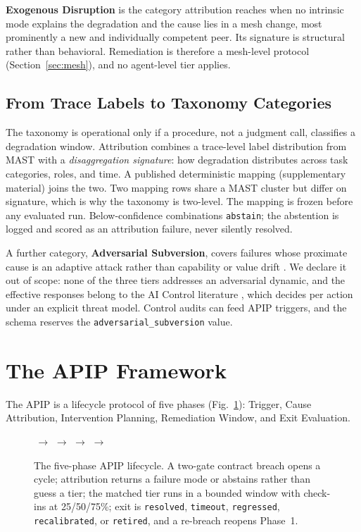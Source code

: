 \documentclass[conference]{IEEEtran}
\newcommand{\code}[1]{\texttt{\small #1}}
\begin{document}
\textbf{Exogenous Disruption} is the category attribution reaches when no
intrinsic mode explains the degradation and the cause lies in a mesh change,
most prominently a new and individually competent peer. Its signature is
structural rather than behavioral. Remediation is therefore a mesh-level
protocol (Section~\ref{sec:mesh}), and no agent-level tier applies.

\subsection{From Trace Labels to Taxonomy Categories}
\label{sec:mapping}

The taxonomy is operational only if a procedure, not a judgment call,
classifies a degradation window. Attribution combines a trace-level label
distribution from MAST \cite{cemri2025} with a \emph{disaggregation signature}:
how degradation distributes across task categories, roles, and time. A
published deterministic mapping (supplementary material) joins the two. Two
mapping rows share a MAST cluster but differ on signature, which is why the
taxonomy is two-level. The mapping is frozen before any evaluated run.
Below-confidence combinations \code{abstain}; the abstention is logged and
scored as an attribution failure, never silently resolved.

A further category, \textbf{Adversarial Subversion}, covers failures whose
proximate cause is an adaptive attack rather than capability or value drift
\cite{bhatt2025, terekhov2025}. We declare it out of scope: none of the three
tiers addresses an adversarial dynamic, and the effective responses belong to
the AI Control literature \cite{greenblatt2023}, which decides per action under
an explicit threat model. Control audits
can feed APIP triggers, and the schema reserves the
\code{adversarial\_subversion} value.

\section{The APIP Framework}
\label{sec:framework}

The APIP is a lifecycle protocol of five phases (Fig.~\ref{fig:lifecycle}):
Trigger, Cause Attribution, Intervention Planning, Remediation Window, and
Exit Evaluation.

\begin{figure}[t]
  \centering
  \scriptsize
  \setlength{\fboxsep}{2pt}
  \,$\rightarrow$\,\,$\rightarrow$\,\,$\rightarrow$\,\,$\rightarrow$\,
  \caption{The five-phase APIP lifecycle. A two-gate contract breach opens a
  cycle; attribution returns a failure mode or abstains rather than guess a
  tier; the matched tier runs in a bounded window with check-ins at 25/50/75\%;
  exit is \code{resolved}, \code{timeout}, \code{regressed},
  \code{recalibrated}, or \code{retired}, and a re-breach reopens Phase~1.}
  \label{fig:lifecycle}
\end{figure}
\end{document}
